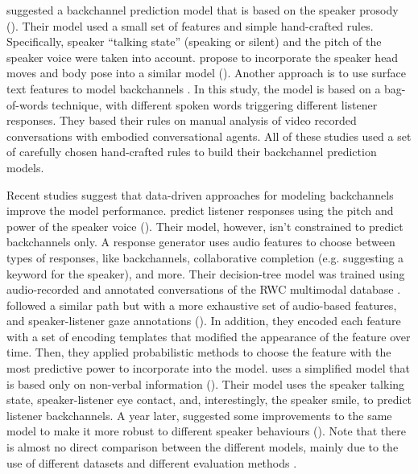 \documentclass[]{simple-thesis}
\begin{document}
\citeauthor{Ward2000} suggested a backchannel prediction model that is based on the speaker prosody (\citeyear{Ward2000}).
Their model used a small set of features and simple hand-crafted rules.
Specifically, speaker ``talking state'' (speaking or silent) and the pitch of the speaker voice were taken into account.
\citeauthor{Gratch2006} propose to incorporate the speaker head moves and body pose into a similar model (\citeyear{Gratch2006}).
Another approach is to use surface text features to model backchannels \citep{Lee2006}.
In this study, the model is based on a bag-of-words technique, with different spoken words triggering different listener responses.
They based their rules on manual analysis of video recorded conversations with embodied conversational agents.
All of these studies used a set of carefully chosen hand-crafted rules to build their backchannel prediction models.

Recent studies suggest that data-driven approaches for modeling backchannels improve the model performance.
\citeauthor{Nishimura2007} predict listener responses using the pitch and power of the speaker voice (\citeyear{Nishimura2007}).
Their model, however, isn't constrained to predict backchannels only.
A response generator uses audio features to choose between types of responses, like backchannels, collaborative completion (e.g. suggesting a keyword for the speaker), and more.
Their decision-tree model was trained using audio-recorded and annotated conversations of the RWC multimodal database \citep{Hayamizu1996}.
\citeauthor{Morency2008} followed a similar path but with a more exhaustive set of audio-based features, and speaker-listener gaze annotations (\citeyear{Morency2008}).
In addition, they encoded each feature with a set of encoding templates that modified the appearance of the feature over time.
Then, they applied probabilistic methods to choose the feature with the most predictive power to incorporate into the model.
\citeauthor{Huang2011} uses a simplified model that is based only on non-verbal information (\citeyear{Huang2011}).
Their model uses the speaker talking state, speaker-listener eye contact, and, interestingly, the speaker smile, to predict listener backchannels.
A year later, \citeauthor{Kok2012} suggested some improvements to the same model to make it more robust to different speaker behaviours (\citeyear{Kok2012}).
Note that there is almost no direct comparison between the different models, mainly due to the use of different datasets and different evaluation methods \citep{Morency2008}.
\end{document}
